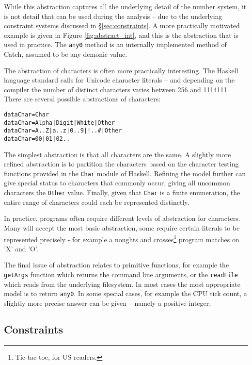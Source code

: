 \documentclass[preprint]{sigplanconf}
\newcommand{\T}[1]{\texttt{#1}}
\newenvironment{code}{\begin{alltt}\small}{\end{alltt}}
\begin{document}
While this abstraction captures all the underlying detail of the number system, it is not detail that can be used during the analysis -- due to the underlying constraint systems discussed in \S\ref{sec:constraints}. A more practically motivated example is given in Figure \ref{fig:abstract_int}, and this is the abstraction that is used in practice. The \T{any0} method is an internally implemented method of Catch, assumed to be any demonic value.

The abstraction of characters is often more practically interesting. The Haskell language standard calls for Unicode character literals -- and depending on the compiler the number of distinct characters varies between 256 and 1114111. There are several possible abstractions of characters:

\begin{code}
data Char = Char
data Char = Alpha | Digit | White | Other
data Char = A .. Z | a .. z | 0 .. 9 | ! .. # | Other
data Char = 00 | 01 | 02 ..
\end{code}

The simplest abstraction is that all characters are the same. A slightly more refined abstraction is to partition the characters based on the character testing functions provided in the \T{Char} module of Haskell. Refining the model further can give special status to characters that commonly occur, giving all uncommon characters the \T{Other} value. Finally, given that \T{Char} is a finite enumeration, the entire range of characters could each be represented distinctly.

In practice, programs often require different levels of abstraction for characters. Many will accept the most basic abstraction, some require certain literals to be represented precisely - for example a noughts and crosses\footnote{Tic-tac-toe, for US readers.} program matches on 'X' and 'O'.

The final issue of abstraction relates to primitive functions, for example the \T{getArgs} function which returns the command line arguments, or the \T{readFile} which reads from the underlying filesystem. In most cases the most appropriate model is to return \T{any0}. In some special cases, for example the CPU tick count, a slightly more precise answer can be given -- namely a positive integer.


\subsection{Constraints}
\end{document}
